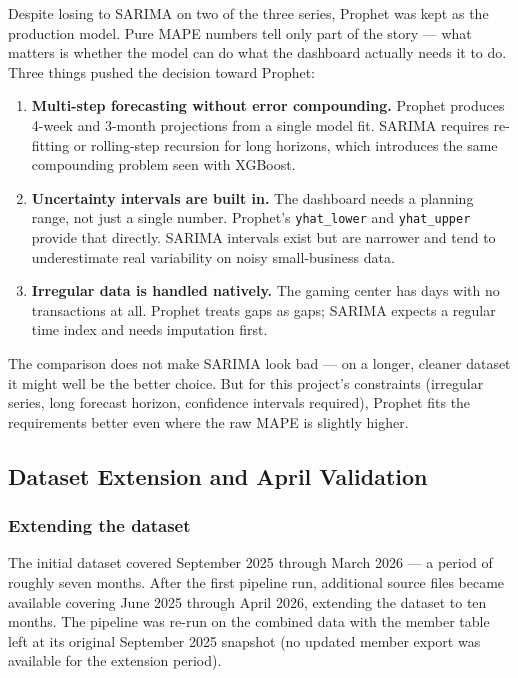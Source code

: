 \documentclass[12pt, a4paper]{report}
\begin{document}
Despite losing to SARIMA on two of the three series, Prophet was kept as the
production model. Pure MAPE numbers tell only part of the story --- what matters
is whether the model can do what the dashboard actually needs it to do. Three
things pushed the decision toward Prophet:

\begin{enumerate}
  \item \textbf{Multi-step forecasting without error compounding.} Prophet
        produces 4-week and 3-month projections from a single model fit.
        SARIMA requires re-fitting or rolling-step recursion for long horizons,
        which introduces the same compounding problem seen with XGBoost.
  \item \textbf{Uncertainty intervals are built in.} The dashboard needs a
        planning range, not just a single number. Prophet's
        \texttt{yhat\_lower} and \texttt{yhat\_upper} provide that directly.
        SARIMA intervals exist but are narrower and tend to underestimate
        real variability on noisy small-business data.
  \item \textbf{Irregular data is handled natively.} The gaming center has
        days with no transactions at all. Prophet treats gaps as gaps;
        SARIMA expects a regular time index and needs imputation first.
\end{enumerate}

The comparison does not make SARIMA look bad --- on a longer, cleaner dataset
it might well be the better choice. But for this project's constraints (irregular
series, long forecast horizon, confidence intervals required), Prophet fits
the requirements better even where the raw MAPE is slightly higher.

\subsection{Dataset Extension and April Validation}
\label{sec:april_validation}

\subsubsection*{Extending the dataset}

The initial dataset covered September 2025 through March 2026 --- a period of
roughly seven months. After the first pipeline run, additional source files
became available covering June 2025 through April 2026, extending the dataset
to ten months. The pipeline was re-run on the combined data with the member
table left at its original September 2025 snapshot (no updated member export
was available for the extension period).
\end{document}
